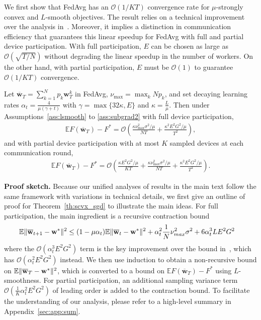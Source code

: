 We first show that FedAvg has an $\mathcal{O}(1/KT)$ convergence rate
for $\mu$-strongly convex and $L$-smooth objectives. The result relies on a technical improvement over the analysis in~\cite{li2019convergence}. Moreover, it
implies a distinction in communication efficiency that guarantees
this linear speedup for FedAvg with full and partial device participation.
With full participation, $E$ can be chosen as large as $\mathcal{O}(\sqrt{T/N})$
without degrading the linear speedup in the number of workers. On
the other hand, with partial participation, $E$ must be $\mathcal{O}(1)$
to guarantee $\mathcal{O}(1/KT)$ convergence.
\begin{theorem}
	\label{thm:SGD_scvx}Let $\overline{\mathbf{w}}_{T}=\sum_{k=1}^{N}p_{k}\mathbf{w}_{T}^{k}$ in FedAvg,
	$\nu_{\max}=\max_{k}Np_{k}$, and set decaying learning rates $\alpha_{t}=\frac{4}{\mu(\gamma+t)}$
	with $\gamma=\max\{32\kappa,E\}$ and $\kappa=\frac{L}{\mu}$. Then
	under Assumptions~\ref{ass:lsmooth} to \ref{ass:subgrad2} with full device participation, 
	\begin{align*}
	\mathbb{E}F(\overline{\mathbf{w}}_{T})-F^{\ast}=\mathcal{O}\left(\frac{\kappa\nu_{\max}^{2}\sigma^{2}/\mu}{NT}+\frac{\kappa^{2}E^{2}G^{2}/\mu}{T^{2}}\right),
	\end{align*}
	and with partial device participation with at most $K$ sampled devices
	at each communication round, 
	\begin{align*}
	\mathbb{E}F(\overline{\mathbf{w}}_{T})-F^{\ast}=\mathcal{O}\left(\frac{\kappa E^{2}G^{2}/\mu}{KT}+\frac{\kappa\nu_{\max}^{2}\sigma^{2}/\mu}{NT}+\frac{\kappa^{2}E^{2}G^{2}/\mu}{T^{2}}\right).
	\end{align*}
	\label{th:scvx_sgd}
\end{theorem}
\textbf{Proof sketch.} Because our unified analyses of results in the main text follow the same framework with variations in technical details, we first give an outline of proof  for Theorem~\ref{th:scvx_sgd} to illustrate the main ideas. For full participation, the main ingredient is a recursive contraction bound 
	\begin{align*}
	\mathbb{E}\|{\overline{\mathbf{w}}}_{t+1}-{\mathbf{w}}^{\ast}\|^{2} & \leq(1-\mu\alpha_{t})\mathbb{E}\|{\overline{\mathbf{w}}}_{t}-{\mathbf{w}}^{\ast}\|^{2}+\alpha_{t}^{2}\frac{1}{N}\nu_{max}^{2}\sigma^{2}+6\alpha_{t}^{3}LE^{2}G^{2}
	\end{align*}
 where the $\mathcal{O}(\alpha_{t}^{3}E^{2}G^{2})$ term is the key improvement over the bound in~\cite{li2019convergence}, which has $\mathcal{O}(\alpha_{t}^{2}E^2 G^2)$ instead. We then use induction to obtain a non-recursive bound on $\mathbb{E}\|{\overline{\mathbf{w}}}_{T}-{\mathbf{w}}^{\ast}\|^{2}$, which is converted to a bound on $\mathbb{E}F(\overline{\mathbf{w}}_{T})-F^{\ast}$ using $L$-smoothness. For partial participation, an additional sampling variance term $\mathcal{O}(\frac{1}{K} \alpha_t^2 E^2G^2)$ of leading order is added to the contraction bound. To facilitate the understanding of our analysis, please refer to a high-level summary in Appendix~\ref{sec:app:sum}.


